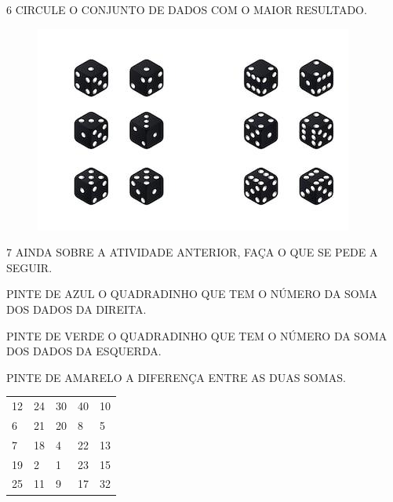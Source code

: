 \num{6} CIRCULE O CONJUNTO DE DADOS COM O MAIOR RESULTADO.


\begin{figure}[htpb!]
\includegraphics[width=\textwidth]{media/image7.jpg}
\end{figure}


\num{7} AINDA SOBRE A ATIVIDADE ANTERIOR, FAÇA O QUE SE PEDE A SEGUIR.

\begin{escolha}
\item PINTE DE AZUL O QUADRADINHO QUE TEM O NÚMERO DA SOMA DOS DADOS DA DIREITA.

\item PINTE DE VERDE O QUADRADINHO QUE TEM O NÚMERO DA SOMA DOS DADOS DA ESQUERDA.

\item PINTE DE AMARELO A DIFERENÇA ENTRE AS DUAS SOMAS.
\end{escolha}

\begin{longtable}[]{@{}lllll@{}}
\toprule
12 & 24 & 30 & 40 & 10\tabularnewline
6 & 21 & 20 & 8 & 5\tabularnewline
7 & 18 & 4 & 22 & 13\tabularnewline
19 & 2 & 1 & 23 & 15\tabularnewline
25 & 11 & 9 & 17 & 32\tabularnewline
\bottomrule
\end{longtable}

